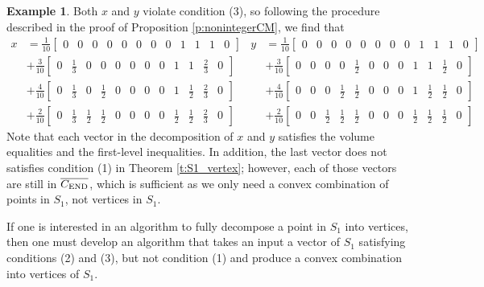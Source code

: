 \documentclass[12pt]{amsart}
\theoremstyle{definition}
\newtheorem{example}[thm]{Example}
\numberwithin{equation}{section}
\renewcommand\>{\rangle}
\newcommand\<{\langle}
\newcommand\0{\mathbf{0}}
\newcommand{\CEND}{C_\textnormal{END}}
\begin{document}
\begin{example}
	Both $x$ and $y$ violate condition (3), so following the procedure described in the proof of Proposition \ref{p:nonintegerCM}, we find that 
	\begin{align*}
		x &= \frac{1}{10}\begin{bmatrix}
			0 & 0 & 0 & 0 & 0 & 0 & 0 & 0 & 1 & 1 & 1 & 0
		\end{bmatrix} & 
		y &= \frac{1}{10}\begin{bmatrix}
			0 & 0 & 0 & 0 & 0 & 0 & 0 & 0 & 1 & 1 & 1 & 0
		\end{bmatrix}
		\\
		&+ \frac{3}{10}\begin{bmatrix}
			0 & \frac{1}{3} & 0 & 0 & 0 & 0 & 0 & 0 & 1 & 1 & \frac{2}{3}  & 0
		\end{bmatrix} & 
		&+ \frac{3}{10}\begin{bmatrix}
			0 & 0 & 0 & 0 & \frac{1}{2} & 0 & 0 & 0 & 1 & 1 & \frac{1}{2} & 0
		\end{bmatrix}
		\\
		&+ \frac{4}{10}\begin{bmatrix}
			0 & \frac{1}{3} & 0 & \frac{1}{2}  & 0 & 0 & 0 & 0 & 1 & \frac{1}{2} & \frac{2}{3} & 0
		\end{bmatrix} &
		&+ \frac{4}{10}\begin{bmatrix}
			0 & 0 & 0 & \frac{1}{2} & \frac{1}{2} & 0 & 0 & 0 & 1 & \frac{1}{2} & \frac{1}{2} & 0
		\end{bmatrix} 
		\\
		&+ \frac{2}{10}\begin{bmatrix}
			0 & \frac{1}{3} & \frac{1}{2} & \frac{1}{2} & 0 & 0 & 0 & 0 & \frac{1}{2} & \frac{1}{2} & \frac{2}{3} & 0
		\end{bmatrix} &
		&+ \frac{2}{10}\begin{bmatrix}
			0 & 0 & \frac{1}{2} & \frac{1}{2} & \frac{1}{2} & 0 & 0 & 0 & \frac{1}{2} & \frac{1}{2} & \frac{1}{2} & 0
		\end{bmatrix}
	\end{align*}
	Note that each vector in the decomposition of $x$ and $y$ satisfies the volume equalities and the first-level inequalities. In addition, the last vector does not satisfies condition (1) in Theorem \ref{t:S1_vertex}; however, each of those vectors are still in $\overline{\CEND}$, which is sufficient as we only need a convex combination of points in $S_1$, not vertices in $S_1$.
	
	If one is interested in an algorithm to fully decompose a point in $S_1$ into vertices, then one must develop an algorithm that takes an input a vector of $S_1$ satisfying conditions (2) and (3), but not condition (1) and produce a convex combination into vertices of $S_1$.
\end{example}
\end{document}
